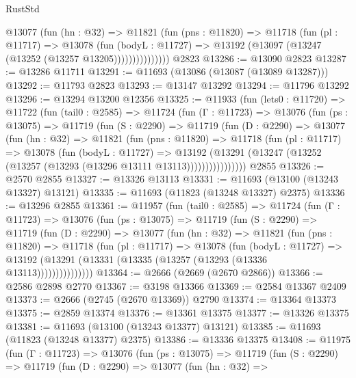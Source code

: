 \begin{lexlean}{RustStd}
\begin{coremodule}
                @13077
                  (fun (hn : @32) =>
                  @11821
                    (fun (pns : @11820) =>
                    @11718
                      (fun (pl : @11717) =>
                      @13078
                        (fun (bodyL : @11727) =>
                        @13192 (@13097 (@13247 (@13252 (@13257 @13205)))))))))))))))
    @2823
@13286 := @13090 @2823
@13287 := @13286 @11711
@13291 := @11693 (@13086 (@13087 (@13089 @13287)))
@13292 := @11793 @2823
@13293 := @13147 @13292
@13294 := @11796 @13292
@13296 := @13294 @13200 @12356
@13325 := @11933
    (fun (lets0 : @11720) =>
    @11722
      (fun (tail0 : @2585) =>
      @11724
        (fun (Γ : @11723) =>
        @13076
          (fun (ps : @13075) =>
          @11719
            (fun (S : @2290) =>
            @11719
              (fun (D : @2290) =>
              @13077
                (fun (hn : @32) =>
                @11821
                  (fun (pns : @11820) =>
                  @11718
                    (fun (pl : @11717) =>
                    @13078
                      (fun (bodyL : @11727) =>
                      @13192
                        (@13291
                          (@13247 (@13252 (@13257 (@13293 (@13296 @13111 @13113))))))))))))))))
    @2855
@13326 := @2570 @2855
@13327 := @13326 @13113
@13331 := @11693 (@13100 (@13243 @13327) @13121)
@13335 := @11693 (@11823 (@13248 @13327) @2375)
@13336 := @13296 @2855
@13361 := @11957
    (fun (tail0 : @2585) =>
    @11724
      (fun (Γ : @11723) =>
      @13076
        (fun (ps : @13075) =>
        @11719
          (fun (S : @2290) =>
          @11719
            (fun (D : @2290) =>
            @13077
              (fun (hn : @32) =>
              @11821
                (fun (pns : @11820) =>
                @11718
                  (fun (pl : @11717) =>
                  @13078
                    (fun (bodyL : @11727) =>
                    @13192 (@13291 (@13331 (@13335 (@13257 (@13293 (@13336 @13113)))))))))))))))
@13364 := @2666 (@2669 (@2670 @2866))
@13366 := @2586 @2898 @2770
@13367 := @3198 @13366
@13369 := @2584 @13367 @2409
@13373 := @2666 (@2745 (@2670 @13369)) @2790
@13374 := @13364 @13373
@13375 := @2859 @13374
@13376 := @13361 @13375
@13377 := @13326 @13375
@13381 := @11693 (@13100 (@13243 @13377) @13121)
@13385 := @11693 (@11823 (@13248 @13377) @2375)
@13386 := @13336 @13375
@13408 := @11975
    (fun (Γ : @11723) =>
    @13076
      (fun (ps : @13075) =>
      @11719
        (fun (S : @2290) =>
        @11719
          (fun (D : @2290) =>
          @13077
            (fun (hn : @32) =>

\end{coremodule}
\end{lexlean}
